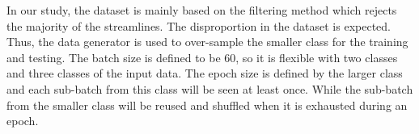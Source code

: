 In our study, the dataset is mainly based on the filtering method which rejects the majority of the streamlines. 
The disproportion in the dataset is expected. Thus, the data generator is used to over-sample the smaller class for the training and testing.
The batch size is defined to be 60, so it is flexible with two classes and three classes of the input data. 
The epoch size is defined by the larger class and each sub-batch from this class will be seen at least once.
While the sub-batch from the smaller class will be reused and shuffled when it is exhausted during an epoch.









